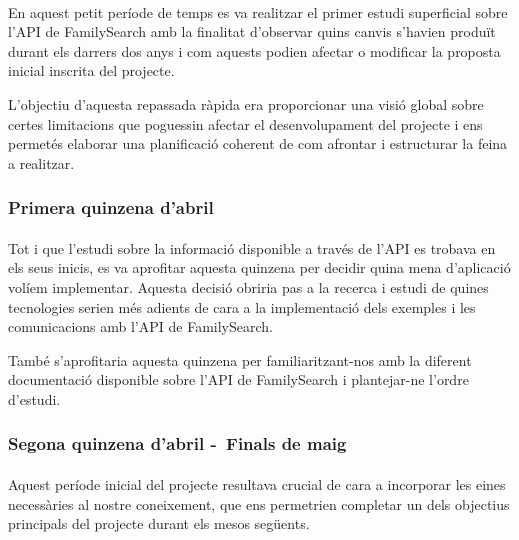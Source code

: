             \paragraph{}
            En aquest petit període de temps es va realitzar el primer estudi superficial sobre l'\gls{API} de FamilySearch amb la finalitat d’observar quins canvis s'havien produït durant els darrers dos anys i com aquests podien afectar o modificar la proposta inicial inscrita del projecte.

            L'objectiu d'aquesta repassada ràpida era proporcionar una visió global sobre certes limitacions que poguessin afectar el desenvolupament del projecte i ens permetés elaborar una planificació coherent de com afrontar i estructurar la feina a realitzar.

        \subsubsection{Primera quinzena d'abril}

            \paragraph{}
            Tot i que l’estudi sobre la informació disponible a través de l'\gls{API} es trobava en els seus inicis, es va aprofitar aquesta quinzena per decidir quina mena d’aplicació volíem implementar. Aquesta decisió obriria pas a la recerca i estudi de quines tecnologies serien més adients de cara a la implementació dels exemples i les comunicacions amb l'\gls{API} de FamilySearch.

            També s'aprofitaria aquesta quinzena per familiaritzant-nos amb la diferent do\-cu\-men\-ta\-ció disponible sobre l'\gls{API} de FamilySearch i plantejar-ne l’ordre d'estudi.

        \subsubsection{Segona quinzena d'abril -\ Finals de maig}

            \paragraph{}
            Aquest període inicial del projecte resultava crucial de cara a incorporar les eines necessàries al nostre coneixement, que ens permetrien completar un dels objectius principals del projecte durant els mesos següents.

